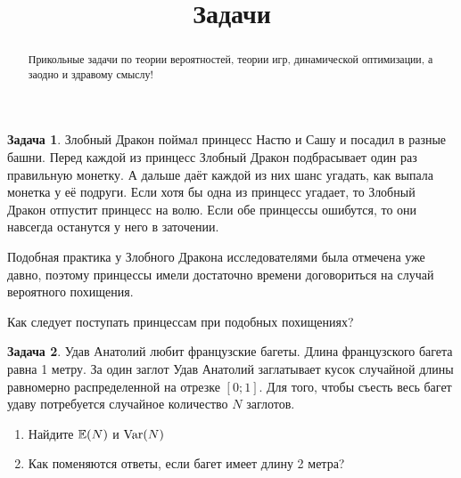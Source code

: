 \documentclass[final,pdftex]{../../template/epsilonj}
\theoremstyle{definition} %
\newtheorem{zadacha}{Задача}
\begin{document}
\setcounter{page}{57}

\begin{frontmatter}
\title{Задачи}

\begin{aug}
\author{ } %


\end{aug}

\begin{abstract}
Прикольные задачи по теории вероятностей, теории игр, динамической оптимизации, а заодно и здравому смыслу!
\end{abstract}

\begin{keyword}
\end{keyword}

\end{frontmatter}




\begin{zadacha}
Злобный Дракон поймал принцесс Настю и Сашу и посадил в разные башни. Перед каждой из принцесс Злобный Дракон подбрасывает один раз правильную монетку. А дальше даёт каждой из них шанс угадать, как выпала монетка у её подруги. Если хотя бы одна из принцесс угадает, то Злобный Дракон отпустит принцесс на волю. Если обе принцессы ошибутся, то они навсегда останутся у него в заточении.

Подобная практика у Злобного Дракона исследователями была отмечена уже давно, поэтому принцессы имели достаточно времени договориться на случай вероятного похищения.

Как следует поступать принцессам при подобных похищениях?
\end{zadacha}

\begin{zadacha}
Удав Анатолий любит французские багеты. Длина французского багета равна 1 метру. За один заглот Удав Анатолий заглатывает кусок случайной длины равномерно распределенной на отрезке $[0;1]$. Для того, чтобы съесть весь багет удаву потребуется случайное количество $N$ заглотов. 
\begin{enumerate}
\item Найдите $\mathbb{E}(N)$ и $\operatorname{Var}(N)$
\item Как поменяются ответы, если багет имеет длину 2 метра?
\end{enumerate}
\end{zadacha}
\end{document}
